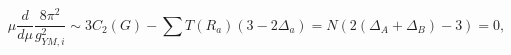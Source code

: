 \begin{equation}
\mu\frac{d}{d\mu}\frac{8\pi^2}{g_{YM,i}^2}\sim 3 C_2(G) -\sum T(R_a)(3-2\Delta_a)= N (2(\Delta_A+\Delta_B)-3)=0,
\label{betaex}
\end{equation}

